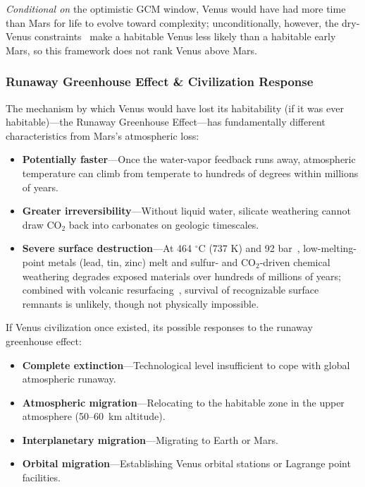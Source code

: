 \documentclass[aps,prd,twocolumn,superscriptaddress,nofootinbib]{revtex4-2}
\begin{document}
\textit{Conditional on} the optimistic GCM window, Venus would have had more time than Mars for life to evolve toward complexity; unconditionally, however, the dry-Venus constraints~\cite{Constantinou2024,Turbet2021,Warren2023} make a habitable Venus less likely than a habitable early Mars, so this framework does not rank Venus above Mars.

\subsubsection{Runaway Greenhouse Effect \& Civilization Response}\label{sec:venus-greenhouse}

The mechanism by which Venus would have lost its habitability (if it was ever habitable)---the Runaway Greenhouse Effect---has fundamentally different characteristics from Mars's atmospheric loss:

\begin{itemize}
  \item \textbf{Potentially faster}---Once the water-vapor feedback runs away, atmospheric temperature can climb from temperate to hundreds of degrees within millions of years.
  \item \textbf{Greater irreversibility}---Without liquid water, silicate weathering cannot draw CO$_{2}$ back into carbonates on geologic timescales.
  \item \textbf{Severe surface destruction}---At 464 $^{\circ}$C (737 K) and 92 bar~\cite{NASA_Venus_Fact}, low-melting-point metals (lead, tin, zinc) melt and sulfur- and CO$_{2}$-driven chemical weathering degrades exposed materials over hundreds of millions of years; combined with volcanic resurfacing~\cite{Strom1994}, survival of recognizable surface remnants is unlikely, though not physically impossible.
\end{itemize}

If Venus civilization once existed, its possible responses to the runaway greenhouse effect:

\begin{itemize}
  \item \textbf{Complete extinction}---Technological level insufficient to cope with global atmospheric runaway.
  \item \textbf{Atmospheric migration}---Relocating to the habitable zone in the upper atmosphere (50--60~km altitude).
  \item \textbf{Interplanetary migration}---Migrating to Earth or Mars.
  \item \textbf{Orbital migration}---Establishing Venus orbital stations or Lagrange point facilities.
\end{itemize}
\end{document}
